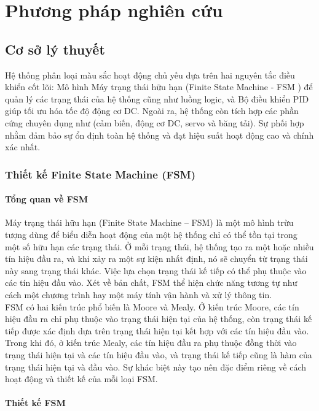 \chapter{Phương pháp nghiên cứu}
\section{Cơ sở lý thuyết}
Hệ thống phân loại màu sắc hoạt động chủ yếu dựa trên hai nguyên tắc điều khiển cốt lõi: Mô hình Máy trạng thái hữu hạn (Finite State Machine - FSM ) để quản lý các trạng thái của hệ thống cũng như luồng logic, và Bộ điều khiển PID giúp tối ưu hóa tốc độ động cơ DC. Ngoài ra, hệ thống còn tích hợp các phần cứng chuyên dụng như (cảm biến, động cơ DC, servo và băng tải). Sự phối hợp nhằm đảm bảo sự ổn định toàn hệ thống và đạt hiệu suất hoạt động cao và chính xác nhất. 

\subsection{Thiết kế Finite State Machine (FSM)}
\subsubsection{Tổng quan về FSM}
Máy trạng thái hữu hạn (Finite State Machine – FSM) là một mô hình trừu tượng dùng để biểu diễn hoạt động của một hệ thống chỉ có thể tồn tại trong một số hữu hạn các trạng thái. Ở mỗi trạng thái, hệ thống tạo ra một hoặc nhiều tín hiệu đầu ra, và khi xảy ra một sự kiện nhất định, nó sẽ chuyển từ trạng thái này sang trạng thái khác. Việc lựa chọn trạng thái kế tiếp có thể phụ thuộc vào các tín hiệu đầu vào. Xét về bản chất, FSM thể hiện chức năng tương tự như cách một chương trình hay một máy tính vận hành và xử lý thông tin.\\
FSM có hai kiến trúc phổ biến là Moore và Mealy. Ở kiến trúc Moore, các tín hiệu đầu ra chỉ phụ thuộc vào trạng thái hiện tại của hệ thống, còn trạng thái kế tiếp được xác định dựa trên trạng thái hiện tại kết hợp với các tín hiệu đầu vào. Trong khi đó, ở kiến trúc Mealy, các tín hiệu đầu ra phụ thuộc đồng thời vào trạng thái hiện tại và các tín hiệu đầu vào, và trạng thái kế tiếp cũng là hàm của trạng thái hiện tại và đầu vào. Sự khác biệt này tạo nên đặc điểm riêng về cách hoạt động và thiết kế của mỗi loại FSM\cite{lewis2013finite}.\\
\subsubsection{Thiết kế FSM}

